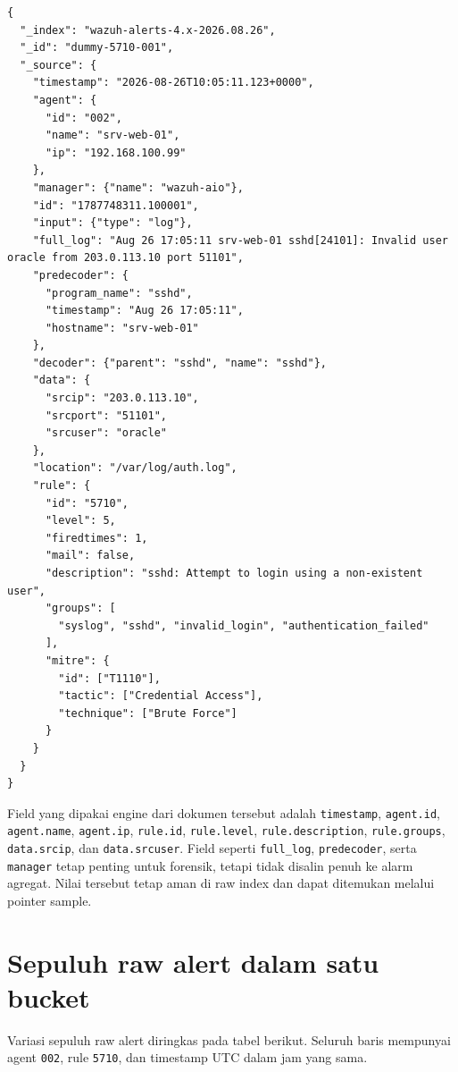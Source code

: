 \documentclass[11pt,a4paper,oneside]{report}
\DeclareRobustCommand{\code}[1]{\nolinkurl{#1}}
\begin{document}
\begin{lstlisting}
{
  "_index": "wazuh-alerts-4.x-2026.08.26",
  "_id": "dummy-5710-001",
  "_source": {
    "timestamp": "2026-08-26T10:05:11.123+0000",
    "agent": {
      "id": "002",
      "name": "srv-web-01",
      "ip": "192.168.100.99"
    },
    "manager": {"name": "wazuh-aio"},
    "id": "1787748311.100001",
    "input": {"type": "log"},
    "full_log": "Aug 26 17:05:11 srv-web-01 sshd[24101]: Invalid user oracle from 203.0.113.10 port 51101",
    "predecoder": {
      "program_name": "sshd",
      "timestamp": "Aug 26 17:05:11",
      "hostname": "srv-web-01"
    },
    "decoder": {"parent": "sshd", "name": "sshd"},
    "data": {
      "srcip": "203.0.113.10",
      "srcport": "51101",
      "srcuser": "oracle"
    },
    "location": "/var/log/auth.log",
    "rule": {
      "id": "5710",
      "level": 5,
      "firedtimes": 1,
      "mail": false,
      "description": "sshd: Attempt to login using a non-existent user",
      "groups": [
        "syslog", "sshd", "invalid_login", "authentication_failed"
      ],
      "mitre": {
        "id": ["T1110"],
        "tactic": ["Credential Access"],
        "technique": ["Brute Force"]
      }
    }
  }
}
\end{lstlisting}

Field yang dipakai engine dari dokumen tersebut adalah
\code{timestamp}, \code{agent.id}, \code{agent.name}, \code{agent.ip},
\code{rule.id}, \code{rule.level}, \code{rule.description},
\code{rule.groups}, \code{data.srcip}, dan \code{data.srcuser}. Field seperti
\code{full_log}, \code{predecoder}, serta \code{manager} tetap penting untuk
forensik, tetapi tidak disalin penuh ke alarm agregat. Nilai tersebut tetap aman
di raw index dan dapat ditemukan melalui pointer sample.

\section{Sepuluh raw alert dalam satu bucket}

Variasi sepuluh raw alert diringkas pada tabel berikut. Seluruh baris mempunyai
agent \code{002}, rule \code{5710}, dan timestamp UTC dalam jam yang sama.
\end{document}
